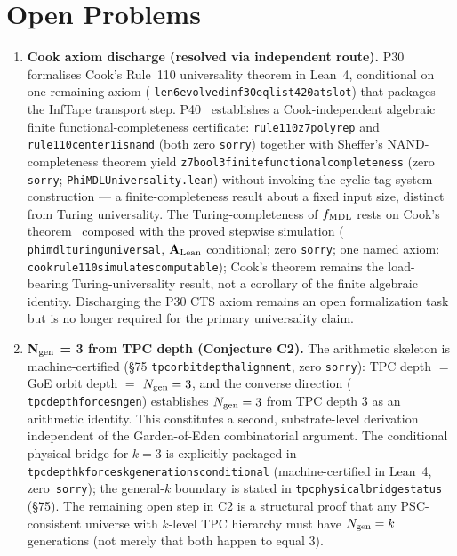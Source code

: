 \documentclass[11pt]{article}
\theoremstyle{remark}
\newcommand{\Ngen}{N_{\rm gen}}
\newcommand{\fmdl}{f_{\rm MDL}}
\newcommand{\lean}[1]{%
  \penalty-100
  \begingroup\def\_{\textunderscore\allowbreak}\texttt{#1}\endgroup}
\newcommand{\CatAL}{\ensuremath{\textbf{A}_{\rm Lean}}}
\begin{document}
\section{Open Problems}
\label{sec:open}

\begin{enumerate}
  \item \textbf{Cook axiom discharge (resolved via independent route).}
    P30~\cite{SpivackCookTheorem} formalises Cook's Rule~110 universality theorem
    in Lean~4, conditional on one remaining axiom
    (\lean{len6\_evolved\_inf30\_eq\_list420\_at\_slot}) that packages the
    InfTape transport step.
    P40~\cite{SpivackGF7Universality} establishes a Cook-independent algebraic
    finite functional-completeness certificate: \lean{rule110\_z7\_poly\_rep} and
    \lean{rule110\_center1\_is\_nand} (both zero \texttt{sorry}) together with
    Sheffer's NAND-completeness theorem yield
    \lean{z7\_bool3\_finite\_functional\_completeness} (zero \texttt{sorry};
    \lean{PhiMDLUniversality.lean}) without invoking the cyclic tag system
    construction --- a finite-completeness result about a fixed input size, distinct
    from Turing universality. The Turing-completeness of $\fmdl$ rests on Cook's
    theorem~\cite{Cook2004} composed with the proved stepwise simulation
    (\lean{phimdl\_turing\_universal}, $\CatAL$ conditional; zero \texttt{sorry}; one
    named axiom: \lean{cook\_rule110\_simulates\_computable}); Cook's theorem remains
    the load-bearing Turing-universality result, not a corollary of the finite
    algebraic identity.
    Discharging the P30 CTS axiom remains an open formalization task
    but is no longer required for the primary universality claim.

  \item \textbf{N$_{\rm gen}$ = 3 from TPC depth (Conjecture C2).}
    The arithmetic skeleton is machine-certified (\S75
    \lean{tpc\_orbit\_depth\_alignment}, zero \texttt{sorry}):
    TPC depth $=$ GoE orbit depth $=$ $\Ngen = 3$, and the converse direction
    (\lean{tpc\_depth\_forces\_ngen}) establishes $\Ngen = 3$ from TPC depth $3$
    as an arithmetic identity. This constitutes a second, substrate-level
    derivation independent of the Garden-of-Eden combinatorial argument.
    The conditional physical bridge for $k=3$ is explicitly packaged in
    \lean{tpc\_depth\_k\_forces\_k\_generations\_conditional} (machine-certified in Lean~4,
    zero~\texttt{sorry}); the general-$k$ boundary is stated in
    \lean{tpc\_physical\_bridge\_status} (\S75).
    The remaining open step in C2 is a structural proof
    that any PSC-consistent universe with $k$-level TPC hierarchy must have
    $\Ngen = k$ generations (not merely that both happen to equal $3$).


\end{enumerate}
\end{document}
